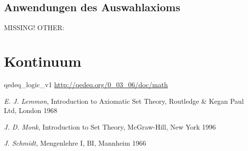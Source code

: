 \documentclass[a4paper,german,10pt,twoside]{book}
\theoremstyle{definition}
\theoremstyle{remark}
\begin{document}
\section{Anwendungen des Auswahlaxioms} \label{chapter6_section1} \hypertarget{chapter6_section1}{}
MISSING! OTHER: 



\chapter{Kontinuum} \label{chapter7} \hypertarget{chapter7}{}




\begin{thebibliography}{99}


 qedeq\_logic\_v1 \url{http://qedeq.org/0_03_06/doc/math}



 \emph{E. J. Lemmon}, Introduction to Axiomatic Set Theory, Routledge \& Kegan Paul Ltd, London 1968

 \emph{J. D. Monk}, Introduction to Set Theory, McGraw-Hill, New York 1996

 \emph{J. Schmidt}, Mengenlehre I, BI, Mannheim 1966

\end{thebibliography}
\backmatter

 \printindex
\end{document}
